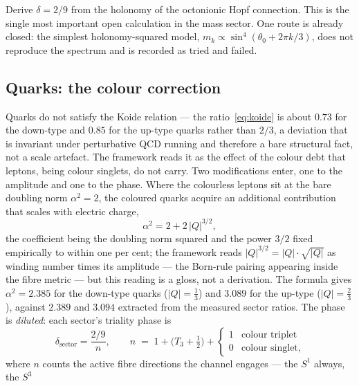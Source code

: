 \begin{openproblem}\label{op:koide-delta}
Derive $\delta = 2/9$ from the holonomy of the octonionic Hopf connection. This is the single most
important open calculation in the mass sector. One route is already closed: the simplest
holonomy-squared model, $m_k \propto \sin^4(\theta_0 + 2\pi k/3)$, does not reproduce the spectrum
and is recorded as tried and failed.
\end{openproblem}

\subsection{Quarks: the colour correction}

Quarks do not satisfy the Koide relation --- the ratio~\eqref{eq:koide} is about $0.73$ for the
down-type and $0.85$ for the up-type quarks rather than $2/3$, a deviation that is invariant under
perturbative QCD running and therefore a bare structural fact, not a scale artefact. The framework
reads it as the effect of the colour debt that leptons, being colour singlets, do not carry. Two
modifications enter, one to the amplitude and one to the phase. Where the colourless leptons sit at
the bare doubling norm $\alpha^2 = 2$, the coloured quarks acquire an additional contribution that
scales with electric charge,
\begin{equation}
  \alpha^2 = 2 + 2\,|Q|^{3/2},
  \label{eq:quarkalpha}
\end{equation}
the coefficient being the doubling norm squared and the power $3/2$ fixed empirically to within one
per cent; the framework reads $|Q|^{3/2} = |Q|\cdot\sqrt{|Q|}$ as winding number times its
amplitude --- the Born-rule pairing appearing inside the fibre metric --- but this reading is a
gloss, not a derivation. The formula gives $\alpha^2 = 2.385$ for the down-type quarks
($|Q|=\tfrac13$) and $3.089$ for the up-type ($|Q|=\tfrac23$), against $2.389$ and $3.094$ extracted
from the measured sector ratios. The phase is \emph{diluted}: each sector's triality phase is
\begin{equation}
  \delta_{\mathrm{sector}} = \frac{2/9}{n},
  \qquad
  n \;=\; 1 + \bigl(T_3 + \tfrac12\bigr) +
  \begin{cases}1 & \text{colour triplet}\\[2pt] 0 & \text{colour singlet,}\end{cases}
  \label{eq:dilution}
\end{equation}
where $n$ counts the active fibre directions the channel engages --- the $S^1$ always, the $S^3$
